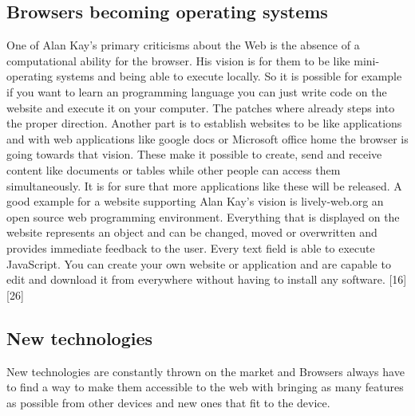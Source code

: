 \documentclass[runningheads]{llncs}
\begin{document}
		\subsection{Browsers becoming operating systems}
	One of Alan Kay's primary criticisms about the Web is the absence of a computational ability for the browser. His vision is for them to be like mini-operating systems and being able to execute locally. So it is possible for example if you want to learn an programming language you can just write code on the website and execute it on your computer. The patches where already steps into the proper direction. Another part is to establish websites to be like applications and with web applications like google docs or Microsoft office home the browser is going towards that vision. These make it possible to create, send and receive content like documents or tables while other people can access them simultaneously. It is for sure that more applications like these will be released.
	A good example for a website supporting Alan Kay's vision is lively-web.org an open source web programming environment.
	Everything that is displayed on the website represents an object and can be changed, moved or overwritten and provides immediate feedback to the user. Every text field is able to execute JavaScript. You can create your own website or application and are capable to edit and download it from everywhere without having to install any software.
	[16][26]
		\subsection{New technologies}
		New technologies are constantly thrown on the market and Browsers always have to find a way to make them accessible to the web with bringing as many features as possible from other devices and new ones that fit to the device.
\end{document}
